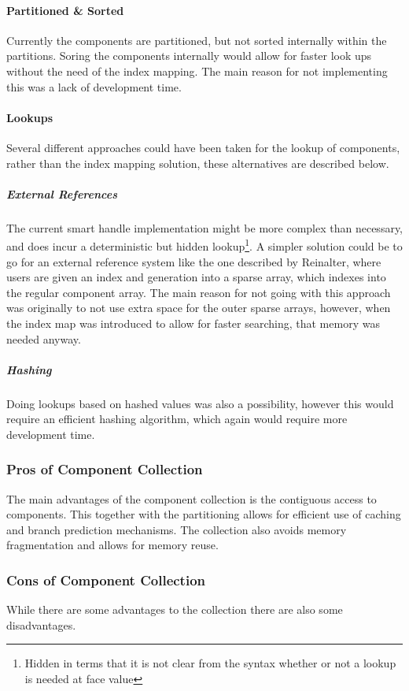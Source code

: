 \paragraph{Partitioned \& Sorted}
Currently the components are partitioned, but not sorted internally within the partitions.
Soring the components internally would allow for faster look ups without the need of the index mapping.
The main reason for not implementing this was a lack of development time.

\paragraph{Lookups}
Several different approaches could have been taken for the lookup of components, rather than the index mapping solution,
these alternatives are described below.

\subparagraph{External References}
The current smart handle implementation might be more complex than necessary, and does incur a deterministic but hidden lookup\footnote{Hidden in terms that it is not clear from the syntax whether or not a lookup is needed at face value}.
A simpler solution could be to go for an external reference system like the one described by Reinalter\cite{molecular_matters_dod_external_references},
where users are given an index and generation into a sparse array, which indexes into the regular component array.
The main reason for not going with this approach was originally to not use extra space for the outer sparse arrays,
however, when the index map was introduced to allow for faster searching, that memory was needed anyway.

\subparagraph{Hashing}
Doing lookups based on hashed values was also a possibility, however this would require an efficient hashing algorithm,
which again would require more development time.

\subsubsection{Pros of Component Collection}
The main advantages of the component collection is the contiguous access to components.
This together with the partitioning allows for efficient use of caching and branch prediction mechanisms.
The collection also avoids memory fragmentation and allows for memory reuse.

\subsubsection{Cons of Component Collection}
While there are some advantages to the collection there are also some disadvantages.

